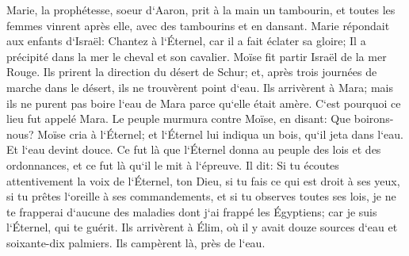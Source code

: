 \verse Marie, la prophétesse, soeur d`Aaron, prit à la main un tambourin, et toutes les femmes vinrent après elle, avec des tambourins et en dansant. 
\verse Marie répondait aux enfants d`Israël: Chantez à l`Éternel, car il a fait éclater sa gloire; Il a précipité dans la mer le cheval et son cavalier. 
\verse Moïse fit partir Israël de la mer Rouge. Ils prirent la direction du désert de Schur; et, après trois journées de marche dans le désert, ils ne trouvèrent point d`eau. 
\verse Ils arrivèrent à Mara; mais ils ne purent pas boire l`eau de Mara parce qu`elle était amère. C`est pourquoi ce lieu fut appelé Mara. 
\verse Le peuple murmura contre Moïse, en disant: Que boirons-nous? 
\verse Moïse cria à l`Éternel; et l`Éternel lui indiqua un bois, qu`il jeta dans l`eau. Et l`eau devint douce. Ce fut là que l`Éternel donna au peuple des lois et des ordonnances, et ce fut là qu`il le mit à l`épreuve. 
\verse Il dit: Si tu écoutes attentivement la voix de l`Éternel, ton Dieu, si tu fais ce qui est droit à ses yeux, si tu prêtes l`oreille à ses commandements, et si tu observes toutes ses lois, je ne te frapperai d`aucune des maladies dont j`ai frappé les Égyptiens; car je suis l`Éternel, qui te guérit. 
\verse Ils arrivèrent à Élim, où il y avait douze sources d`eau et soixante-dix palmiers. Ils campèrent là, près de l`eau. 

